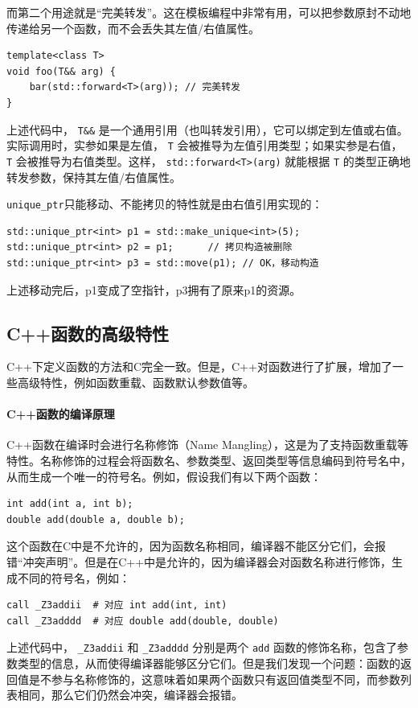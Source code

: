 而第二个用途就是“完美转发”。这在模板编程中非常有用，可以把参数原封不动地传递给另一个函数，而不会丢失其左值/右值属性。
\begin{verbatim}
template<class T>
void foo(T&& arg) {
    bar(std::forward<T>(arg)); // 完美转发
}
\end{verbatim}
上述代码中， \texttt{T\&\&} 是一个通用引用（也叫转发引用），它可以绑定到左值或右值。实际调用时，实参如果是左值， \texttt{T} 会被推导为左值引用类型；如果实参是右值， \texttt{T} 会被推导为右值类型。这样， \texttt{std::forward<T>(arg)} 就能根据 \texttt{T} 的类型正确地转发参数，保持其左值/右值属性。

\texttt{unique\_ptr}只能移动、不能拷贝的特性就是由右值引用实现的：
\begin{verbatim}
std::unique_ptr<int> p1 = std::make_unique<int>(5);
std::unique_ptr<int> p2 = p1;      // 拷贝构造被删除
std::unique_ptr<int> p3 = std::move(p1); // OK，移动构造
\end{verbatim}
上述移动完后，p1变成了空指针，p3拥有了原来p1的资源。

\subsection{C++函数的高级特性}

C++下定义函数的方法和C完全一致。但是，C++对函数进行了扩展，增加了一些高级特性，例如函数重载、函数默认参数值等。

\paragraph{C++函数的编译原理}

C++函数在编译时会进行名称修饰（Name Mangling），这是为了支持函数重载等特性。名称修饰的过程会将函数名、参数类型、返回类型等信息编码到符号名中，从而生成一个唯一的符号名。例如，假设我们有以下两个函数：
\begin{verbatim}
int add(int a, int b);
double add(double a, double b);
\end{verbatim}
这个函数在C中是不允许的，因为函数名称相同，编译器不能区分它们，会报错“冲突声明”。但是在C++中是允许的，因为编译器会对函数名称进行修饰，生成不同的符号名，例如：
\begin{verbatim}
call _Z3addii  # 对应 int add(int, int)
call _Z3adddd  # 对应 double add(double, double)
\end{verbatim}
上述代码中， \texttt{\_Z3addii} 和 \texttt{\_Z3adddd} 分别是两个 \texttt{add} 函数的修饰名称，包含了参数类型的信息，从而使得编译器能够区分它们。但是我们发现一个问题：函数的返回值是不参与名称修饰的，这意味着如果两个函数只有返回值类型不同，而参数列表相同，那么它们仍然会冲突，编译器会报错。

